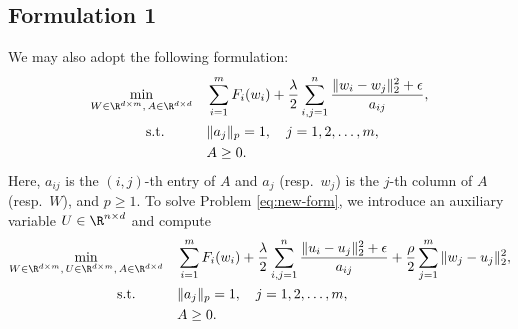 {\subsection{Formulation 1}
We may also adopt the following formulation:
\begin{equation}
\label{eq:new-form}
\begin{aligned}
\min_{W\in\R^{d\times m}, \, A\in\R^{d\times d}} & \quad \sum_{i=1}^m F_i(w_i) + \frac{\lambda}{2}\sum_{i,j=1}^n \frac{\|w_i - w_j\|_2^2+\epsilon}{a_{ij}}, \\
\mbox{s.t.} \qquad & \quad \|a_j\|_p = 1, \quad j=1,2,\dots,m, \\
& \quad A \geq 0.
\end{aligned}
\end{equation}
Here, $a_{ij}$ is the $(i,j)$-th entry of $A$ and $a_j$ (resp.~$w_j$) is the $j$-th column of $A$ (resp.~$W$), and $p\geq 1$. To solve Problem \eqref{eq:new-form}, we introduce an auxiliary variable $U\in\R^{n\times d}$ and compute
\begin{equation}
\label{eq:new-form-U}
\begin{aligned}
\min_{W\in\R^{d\times m}, \, U\in\R^{d\times m}, \, A\in\R^{d\times d}} & \quad \sum_{i=1}^m F_i(w_i) + \frac{\lambda}{2}\sum_{i,j=1}^n \frac{\|u_i - u_j\|_2^2+\epsilon}{a_{ij}} + \frac{\rho}{2}\sum_{j=1}^m\|w_j - u_j\|_2^2, \\
\mbox{s.t.} \qquad & \quad \|a_j\|_p = 1, \quad j=1,2,\dots,m, \\
& \quad A \geq 0.
\end{aligned}
\end{equation}

}
